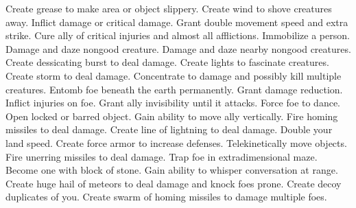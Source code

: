     {Create grease to make area or object slippery.}
    {Create wind to shove creatures away.}
    {Inflict damage or critical damage.}
    {Grant double movement speed and extra strike.}
    {Cure ally of critical injuries and almost all afflictions.}
    {Immobilize a person.}
    {Damage and daze nongood creature.}
    {Damage and daze nearby nongood creatures.}
    {Create dessicating burst to deal damage.}
    {Create lights to fascinate creatures.}
    {Create storm to deal damage.}
    {Concentrate to damage and possibly kill multiple creatures.}
    {Entomb foe beneath the earth permanently.}
    {Grant damage reduction.}
    {Inflict injuries on foe.}
    {Grant ally invisibility until it attacks.}
    {Force foe to dance.}
    {Open locked or barred object.}
    {Gain ability to move ally vertically.}
    {Fire homing missiles to deal damage.}
    {Create line of lightning to deal damage.}
    {Double your land speed.}
    {Create force armor to increase defenses.}
    {Telekinetically move objects.}
    {Fire unerring missiles to deal damage.}
    {Trap foe in extradimensional maze.}
    {Become one with block of stone.}
    {Gain ability to whisper conversation at range.}
    {Create huge hail of meteors to deal damage and knock foes prone.}
    {Create decoy duplicates of you.}
    {Create swarm of homing missiles to damage multiple foes.}

